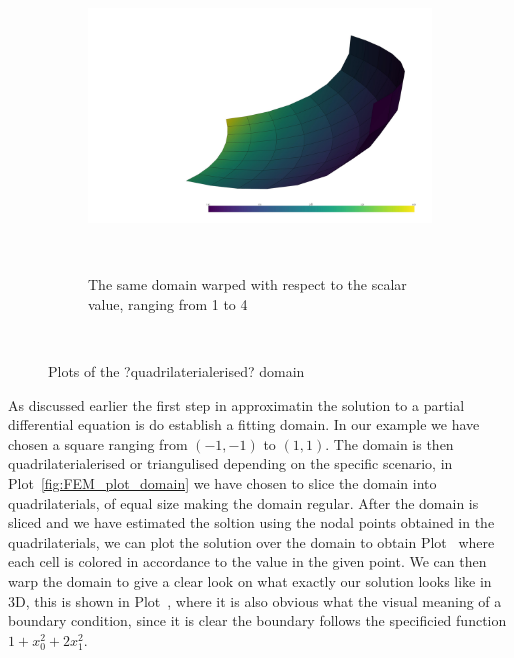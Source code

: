 \begin{figure}[H]
\begin{subfigure}{.3\textwidth}
    \end{subfigure}
    \begin{subfigure}{.3\textwidth}
        \centering
        \includegraphics[width=\textwidth]{Afsnit/Application/figurer/screenshot_3.jpeg}
        \caption{The same domain warped with respect to the scalar value, ranging from 1 to 4}~\label{fig:FEM_plot_3D}
    \end{subfigure}
    \caption{Plots of the ?quadrilaterialerised? domain}~\label{fig:FEM_plots}
\end{figure}

As discussed earlier the first step in approximatin the solution to a partial differential equation is do establish a fitting domain. In our example we have chosen a square ranging from $(-1,-1)$ to $(1,1)$.
The domain is then quadrilaterialerised or triangulised depending on the specific scenario, in Plot~\ref{fig:FEM_plot_domain} we have chosen to slice the domain into quadrilaterials, of equal size making the domain regular.
After the domain is sliced and we have estimated the soltion using the nodal points obtained in the quadrilaterials, we can plot the solution over the domain to obtain Plot~ where each cell is colored in accordance to the value in the given point.
We can then warp the domain to give a clear look on what exactly our solution looks like in 3D, this is shown in Plot~, where it is also obvious what the visual meaning of a boundary condition, since it is clear the boundary follows the specificied function $1 + x_0^2 + 2x_1^2$.